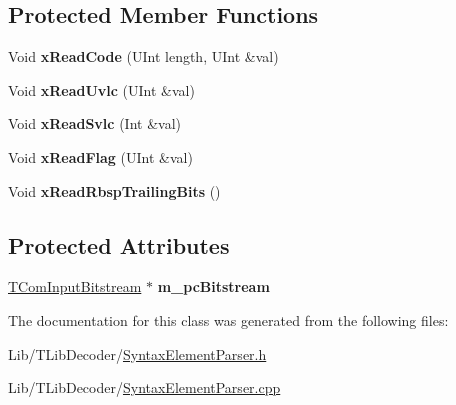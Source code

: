 \subsection*{Protected Member Functions}
{\bf }\par
\begin{DoxyCompactItemize}
\item 
\mbox{\label{class_syntax_element_parser_ac925da15e1257538195a68b2ed3c4fe8}} 
Void {\bfseries x\+Read\+Code} (U\+Int length, U\+Int \&val)
\item 
\mbox{\label{class_syntax_element_parser_a8302db84c82f0f3a8cf764e92f0ea143}} 
Void {\bfseries x\+Read\+Uvlc} (U\+Int \&val)
\item 
\mbox{\label{class_syntax_element_parser_a463e2d5770220100dd757411001f051f}} 
Void {\bfseries x\+Read\+Svlc} (Int \&val)
\item 
\mbox{\label{class_syntax_element_parser_a9da16157dcc13f44f2e0726426a4481f}} 
Void {\bfseries x\+Read\+Flag} (U\+Int \&val)
\item 
\mbox{\label{class_syntax_element_parser_ab565694549fdf7e7a066abf4917b234d}} 
Void {\bfseries x\+Read\+Rbsp\+Trailing\+Bits} ()
\end{DoxyCompactItemize}

\subsection*{Protected Attributes}
\begin{DoxyCompactItemize}
\item 
\mbox{\label{class_syntax_element_parser_a28978d2d6cd180f3be8e99cb4e604c48}} 
\hyperlink{class_t_com_input_bitstream}{T\+Com\+Input\+Bitstream} $\ast$ {\bfseries m\+\_\+pc\+Bitstream}
\end{DoxyCompactItemize}


The documentation for this class was generated from the following files\+:\begin{DoxyCompactItemize}
\item 
Lib/\+T\+Lib\+Decoder/\hyperlink{_syntax_element_parser_8h}{Syntax\+Element\+Parser.\+h}\item 
Lib/\+T\+Lib\+Decoder/\hyperlink{_syntax_element_parser_8cpp}{Syntax\+Element\+Parser.\+cpp}\end{DoxyCompactItemize}
